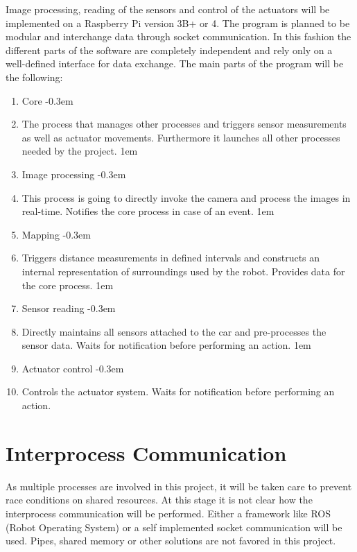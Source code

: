 \documentclass[a4paper,12pt,oneside]{article}
\begin{document}
Image processing, reading of the sensors and control of the actuators will be implemented on a Raspberry Pi version 3B+ or 4. The program is planned to be modular and interchange data through socket communication. In this fashion the different parts of the software are completely independent and rely only on a well-defined interface for data exchange. The main parts of the program will be the following:\\ 
\begin{enumerate}
\item Core
\itemsep-0.3em
\item[] The process that manages other processes and triggers sensor measurements as well as actuator movements. Furthermore it launches all other processes needed by the project.
\itemsep1em
\item Image processing
\itemsep-0.3em
\item[] This process is going to directly invoke the camera and process the images in real-time. Notifies the core process in case of an event.
\itemsep1em
\item Mapping
\itemsep-0.3em
\item[] Triggers distance measurements in defined intervals and constructs an internal representation of surroundings used by the robot. Provides data for the core process.
\itemsep1em
\item Sensor reading
\itemsep-0.3em
\item[] Directly maintains all sensors attached to the car and pre-processes the sensor data. Waits for notification before performing an action.
\itemsep1em
\item Actuator control
\itemsep-0.3em
\item[] Controls the actuator system. Waits for notification before performing an action.
\end{enumerate}

\section*{Interprocess Communication}

As multiple processes are involved in this project, it will be taken care to prevent race conditions on shared resources. At this stage it is not clear how the interprocess communication will be performed. Either a framework like ROS (Robot Operating System) or a self implemented socket communication will be used. Pipes, shared memory or other solutions are not favored in this project.
\end{document}
